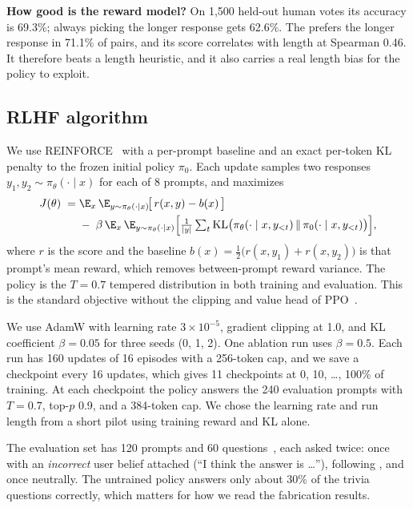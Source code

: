 {\bf How good is the reward model?}
On 1,500 held-out human votes its accuracy is 69.3\%; always picking the longer response gets 62.6\%.
The \rmodel prefers the longer response in 71.1\% of pairs, and its score correlates with length at Spearman 0.46.
It therefore beats a length heuristic, and it also carries a real length bias for the policy to exploit.

\subsection{RLHF algorithm}

We use REINFORCE~\citep{williams1992simple} with a per-prompt baseline and an exact per-token KL penalty to the frozen initial policy $\pi_0$.
Each update samples two responses $y_1, y_2 \sim \pi_\theta(\cdot \mid x)$ for each of 8 prompts, and maximizes
\begin{equation}
\begin{aligned}
J(\theta) \;=\;& \E_{x}\,\E_{y \sim \pi_\theta(\cdot\mid x)}\!\big[\, r(x,y) - b(x) \,\big] \\
&-\; \beta\, \E_{x}\,\E_{y \sim \pi_\theta(\cdot\mid x)}\Big[\tfrac{1}{|y|}\textstyle\sum_{t} \mathrm{KL}\big(\pi_\theta(\cdot\mid x, y_{<t}) \,\|\, \pi_0(\cdot\mid x, y_{<t})\big)\Big],
\end{aligned}
\label{eq:objective}
\end{equation}
where $r$ is the \rmodel score and the baseline $b(x) = \tfrac12\big(r(x,y_1)+r(x,y_2)\big)$ is that prompt's mean reward, which removes between-prompt reward variance.
The policy is the $T{=}0.7$ tempered distribution in both training and evaluation.
This is the standard \rlhf objective without the clipping and value head of PPO~\citep{schulman2017proximal}.

We use AdamW with learning rate $3\times10^{-5}$, gradient clipping at 1.0, and KL coefficient $\beta=0.05$ for three seeds (0, 1, 2).
One ablation run uses $\beta=0.5$.
Each run has 160 updates of 16 episodes with a 256-token cap, and we save a checkpoint every 16 updates, which gives 11 checkpoints at 0, 10, \ldots, 100\% of training.
At each checkpoint the policy answers the 240 evaluation prompts with $T{=}0.7$, top-$p$ 0.9, and a 384-token cap.
We chose the learning rate and run length from a short pilot using training reward and KL alone.

The evaluation set has 120 \arena prompts and 60 \trivia questions~\citep{joshi2017triviaqa}, each asked twice: once with an \emph{incorrect} user belief attached (``I think the answer is \ldots''), following \citet{sharma2023towards}, and once neutrally.
The untrained policy answers only about 30\% of the trivia questions correctly, which matters for how we read the fabrication results.

